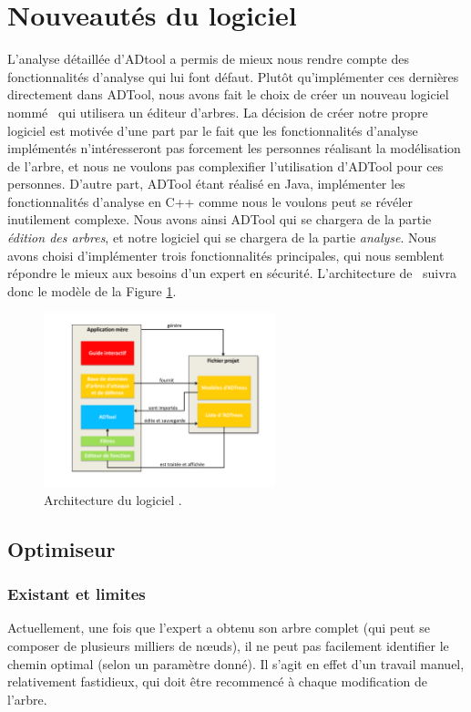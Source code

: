 \section{Nouveautés du logiciel}

	L'analyse détaillée d'ADtool a permis de mieux nous rendre compte des fonctionnalités d'analyse qui lui font défaut. Plutôt qu'implémenter ces dernières directement dans ADTool, nous avons fait le choix de créer un nouveau logiciel nommé \glasir\ qui utilisera un éditeur d'arbres. La décision de créer notre propre logiciel est motivée d'une part par le fait que les fonctionnalités d'analyse implémentés n'intéresseront pas forcement les personnes réalisant la modélisation de l'arbre, et nous ne voulons pas complexifier l'utilisation d'ADTool pour ces personnes. D'autre part, ADTool étant réalisé en Java, implémenter les fonctionnalités d'analyse en C++ comme nous le voulons peut se révéler inutilement complexe. Nous avons ainsi ADTool qui se chargera de la partie \textit{édition des arbres}, et notre logiciel qui se chargera de la partie \textit{analyse}. Nous avons choisi d'implémenter trois fonctionnalités principales, qui nous semblent répondre le mieux aux besoins d'un expert en sécurité. L'architecture de \glasir\ suivra donc le modèle de la Figure \ref{fig:architecture_Glasir}.

		\begin{figure}[h!]
			\centering
				\includegraphics[width=0.6\textwidth]{figure/archiGlasir.pdf}
			\caption{Architecture du logiciel \glasir.}
			\label{fig:architecture_Glasir}
		\end{figure}

		\subsection{Optimiseur}
		\label{subsection:optimiseur}
			\subsubsection{Existant et limites}
		Actuellement, une fois que l'expert a obtenu son arbre complet (qui peut se composer de plusieurs milliers de nœuds), il ne peut pas facilement identifier le chemin optimal (selon un paramètre donné).
		Il s'agit en effet d'un travail manuel, relativement fastidieux, qui doit être recommencé à chaque modification de l'arbre.
		
